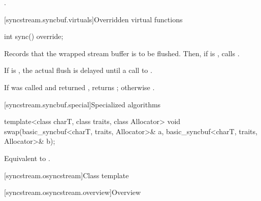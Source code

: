 \begin{itemdescr}
\pnum
\effects
{}.
\end{itemdescr}

[syncstream.syncbuf.virtuals]{Overridden virtual functions}

%
\begin{itemdecl}
int sync() override;
\end{itemdecl}

\begin{itemdescr}
\pnum
\effects
Records that the wrapped stream buffer is to be flushed.
Then, if  is , calls .
\begin{note}
If  is ,
the actual flush is delayed until a call to .
\end{note}

\pnum
\returns
If  was called and returned ,
returns ; otherwise .
\end{itemdescr}

[syncstream.syncbuf.special]{Specialized algorithms}

%
\begin{itemdecl}
template<class charT, class traits, class Allocator>
  void swap(basic_syncbuf<charT, traits, Allocator>& a,
            basic_syncbuf<charT, traits, Allocator>& b);
\end{itemdecl}

\begin{itemdescr}
\pnum
\effects
Equivalent to .
\end{itemdescr}

[syncstream.osyncstream]{Class template }

[syncstream.osyncstream.overview]{Overview}

